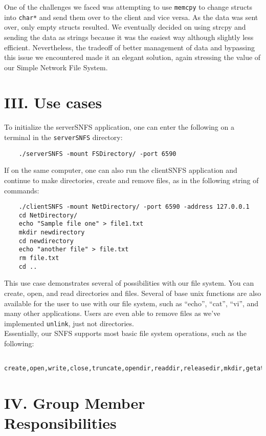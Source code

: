 \documentclass[10pt]{article}
\begin{document}
One of the challenges we faced was attempting to use \texttt{memcpy} to change structs into \texttt{char*} 
and send them over to the client and vice versa. As the data was sent over, only empty structs resulted. 
We eventually decided on using strcpy and sending the data as strings because it was the 
easiest way although slightly less efficient. Nevertheless, the tradeoff of better management of 
data and bypassing this issue we encountered made it an elegant solution, again stressing the 
value of our Simple Network File System. 

\section {III. Use cases}

To initialize the serverSNFS application, one can enter the following on a terminal in the 
\texttt{serverSNFS} directory: 
\begin{verbatim}
	./serverSNFS -mount FSDirectory/ -port 6590
\end{verbatim}

If on the same computer, one can also run the clientSNFS application and continue to 
make directories, create and remove files, as in the following string of commands: 
\begin{verbatim}
	./clientSNFS -mount NetDirectory/ -port 6590 -address 127.0.0.1 
	cd NetDirectory/ 
	echo "Sample file one" > file1.txt
	mkdir newdirectory 
	cd newdirectory
	echo "another file" > file.txt 
	rm file.txt 
	cd ..
\end{verbatim} 

This use case demonstrates several of possibilities with our file system. You can create, open, 
and read directories and files. Several of base unix functions are also available for the user 
to use with our file system, such as ``echo'', ``cat'', ``vi'', and many other applications. 
Users are even able to remove files as we've implemented \texttt{unlink}, just not directories. \\

Essentially, our SNFS supports most basic file system operations, such as the following:
\begin{verbatim}
	create,open,write,close,truncate,opendir,readdir,releasedir,mkdir,getattr,unlink
\end{verbatim}

\section {IV. Group Member Responsibilities}
\end{document}
